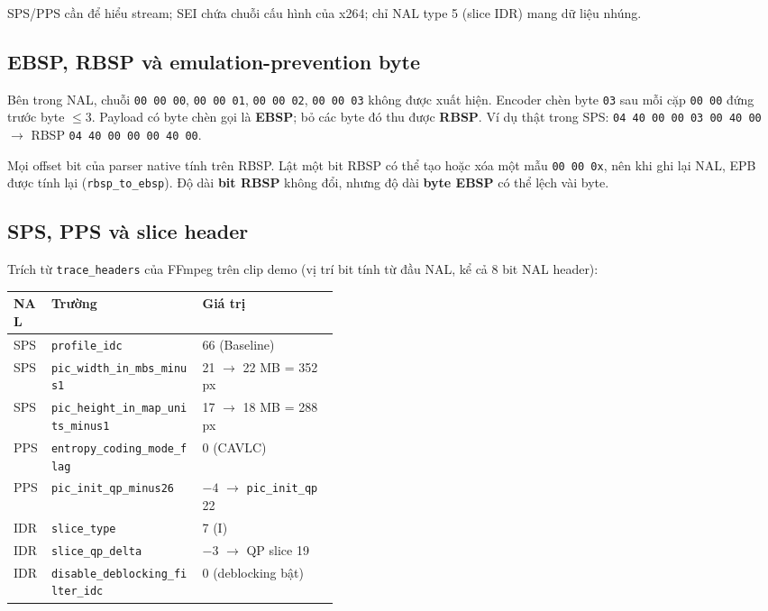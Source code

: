 \documentclass[11pt,a4paper]{article}
\begin{document}
SPS/PPS cần để hiểu stream; SEI chứa chuỗi cấu hình của x264; chỉ NAL type 5
(slice IDR) mang dữ liệu nhúng.

\subsection{EBSP, RBSP và emulation-prevention byte}
\label{sec:epb}

Bên trong NAL, chuỗi \texttt{00 00 00}, \texttt{00 00 01}, \texttt{00 00 02},
\texttt{00 00 03} không được xuất hiện. Encoder chèn byte \texttt{03} sau mỗi cặp
\texttt{00 00} đứng trước byte \(\le 3\). Payload có byte chèn gọi là
\textbf{EBSP}; bỏ các byte đó thu được \textbf{RBSP}. Ví dụ thật trong SPS:
\texttt{04 40 00 00 03 00 40 00} \(\rightarrow\) RBSP
\texttt{04 40 00 00 00 40 00}.

Mọi offset bit của parser native tính trên RBSP. Lật một bit RBSP có thể tạo hoặc
xóa một mẫu \texttt{00 00 0x}, nên khi ghi lại NAL, EPB được tính lại
(\texttt{rbsp\_to\_ebsp}). Độ dài \textbf{bit RBSP} không đổi, nhưng độ dài
\textbf{byte EBSP} có thể lệch vài byte.

\subsection{SPS, PPS và slice header}

Trích từ \texttt{trace\_headers} của FFmpeg trên clip demo (vị trí bit tính từ đầu
NAL, kể cả 8 bit NAL header):

\begin{center}
\small
\begin{tabular}{llp{0.42\linewidth}}
\toprule
NAL & Trường & Giá trị \\
\midrule
SPS & \texttt{profile\_idc} & 66 (Baseline) \\
SPS & \texttt{pic\_width\_in\_mbs\_minus1} & 21 \(\rightarrow\) 22 MB = 352 px \\
SPS & \texttt{pic\_height\_in\_map\_units\_minus1} & 17 \(\rightarrow\) 18 MB = 288 px \\
PPS & \texttt{entropy\_coding\_mode\_flag} & 0 (CAVLC) \\
PPS & \texttt{pic\_init\_qp\_minus26} & \(-4\) \(\rightarrow\) \texttt{pic\_init\_qp} 22 \\
IDR & \texttt{slice\_type} & 7 (I) \\
IDR & \texttt{slice\_qp\_delta} & \(-3\) \(\rightarrow\) QP slice 19 \\
IDR & \texttt{disable\_deblocking\_filter\_idc} & 0 (deblocking bật) \\
\bottomrule
\end{tabular}
\end{center}
\end{document}
